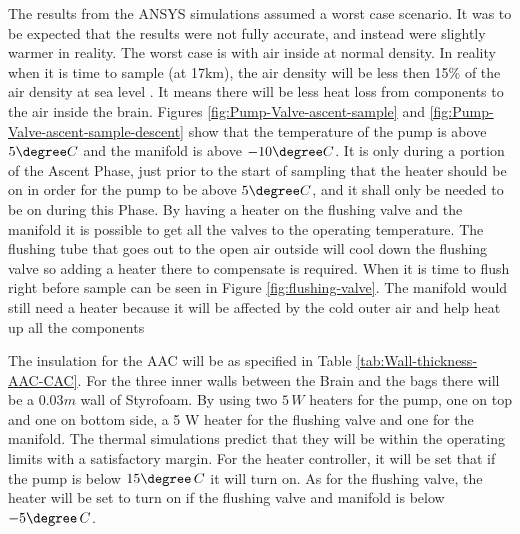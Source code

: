 \documentclass[a4paper,12pt,twoside]{article}
\begin{document}
\begin{appendices}
The results from the ANSYS simulations assumed a worst case scenario. It was to be expected that the results were not fully accurate, and instead were slightly warmer in reality. The worst case is with air inside at normal density. In reality when it is time to sample (at 17km), the air density will be less then 15\% of the air density at sea level \cite{EngToolair}. It means there will be less heat loss from components to the air inside the brain. Figures \ref{fig:Pump-Valve-ascent-sample} and \ref{fig:Pump-Valve-ascent-sample-descent} show that the temperature of the pump is above $5\degree C$ and the manifold is above $-10\degree C$. It is only during a portion of the Ascent Phase, just prior to the start of sampling that the heater should be on in order for the pump to be above $5\degree C$, and it shall only be needed to be on during this Phase. By having a heater on the flushing valve and the manifold it is possible to get all the valves to the operating temperature. The flushing tube that goes out to the open air outside will cool down the flushing valve so adding a heater there to compensate is required. When it is time to flush right before sample can be seen in Figure \ref{fig:flushing-valve}. The manifold would still need a heater because it will be affected by the cold outer air and help heat up all the components

The insulation for the AAC will be as specified in Table \ref{tab:Wall-thickness-AAC-CAC}. For the three inner walls between the Brain and the bags there will be a $0.03 m$ wall of Styrofoam. By using two $5\,W$ heaters for the pump, one on top and one on bottom side, a 5 W heater for the flushing valve and one for the manifold. The thermal simulations predict that they will be within the operating limits with a satisfactory margin. For the heater controller, it will be set that if the pump is below $15\degree\,C$ it will turn on. As for the flushing valve, the heater will be set to turn on if the flushing valve and manifold is below $-5 \degree\,C$.



\end{appendices}
\end{document}
